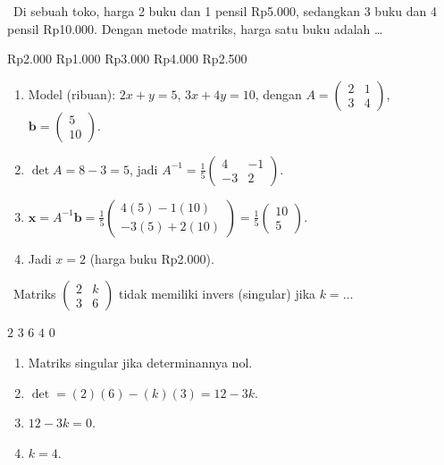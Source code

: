 \documentclass[11pt,a4paper]{exam}
\newenvironment{langkah}{%
  \begin{enumerate}[label=\textbf{Langkah \arabic*:},leftmargin=2.6em,
    itemsep=2pt,topsep=2pt]}{\end{enumerate}}
\newcommand{\Adv}{{\footnotesize\textsf{\textcolor{oranye}{[Advanced]}}}\ }
\begin{document}
\begin{questions}
\question \Adv Di sebuah toko, harga 2 buku dan 1 pensil Rp5.000, sedangkan 3 buku
dan 4 pensil Rp10.000. Dengan metode matriks, harga satu buku adalah \dots
\begin{choices}
\CorrectChoice Rp2.000 \choice Rp1.000 \choice Rp3.000 \choice Rp4.000 \choice Rp2.500
\end{choices}
\begin{solution}
\begin{langkah}
\item Model (ribuan): $2x+y=5$, $3x+4y=10$, dengan $A=\begin{pmatrix}2&1\\3&4\end{pmatrix}$, $\mathbf b=\begin{pmatrix}5\\10\end{pmatrix}$.
\item $\det A = 8-3 = 5$, jadi $A^{-1}=\tfrac15\begin{pmatrix}4&-1\\-3&2\end{pmatrix}$.
\item $\mathbf x = A^{-1}\mathbf b = \tfrac15\begin{pmatrix}4(5)-1(10)\\-3(5)+2(10)\end{pmatrix} = \tfrac15\begin{pmatrix}10\\5\end{pmatrix}$.
\item Jadi $x = 2$ (harga buku Rp2.000).
\end{langkah}
\end{solution}

\question \Adv Matriks $\begin{pmatrix} 2 & k\\ 3 & 6 \end{pmatrix}$ tidak memiliki
invers (singular) jika $k = \dots$
\begin{choices}
\choice $2$ \choice $3$ \choice $6$ \CorrectChoice $4$ \choice $0$
\end{choices}
\begin{solution}
\begin{langkah}
\item Matriks singular jika determinannya nol.
\item $\det = (2)(6) - (k)(3) = 12 - 3k$.
\item $12 - 3k = 0$.
\item $k = 4$.
\end{langkah}
\end{solution}


\end{questions}
\end{document}
